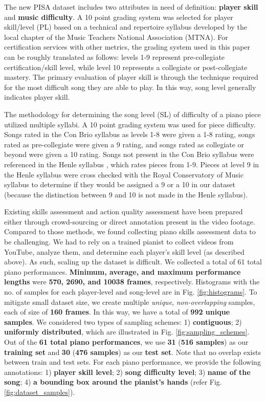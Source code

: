 \documentclass{article}
\begin{document}
The new PISA dataset includes two attributes in need of definition: \textbf{player skill} and \textbf{music difficulty}. A 10 point grading system was selected for player skill/level (PL) based on a technical and repertoire syllabus \cite{jaiden_1} developed by the local chapter of the Music Teachers National Association (MTNA). For certification services with other metrics, the grading system used in this paper can be roughly translated as follows: levels 1-9 represent pre-collegiate certification/skill level, while level 10 represents a collegiate or post-collegiate mastery. The primary evaluation of player skill is through the technique required for the most difficult song they are able to play. In this way, song level generally indicates player skill.

The methodology for determining the song level (SL) of difficulty of a piano piece utilized multiple syllabi. A 10 point grading system was used for piece difficulty. Songs rated in the Con Brio syllabus \cite{jaiden_3} as levels 1-8 were given a 1-8 rating, songs rated as pre-collegiate were given a 9 rating, and songs rated as collegiate or beyond were given a 10 rating. Songs not present in the Con Brio syllabus were referenced in the Henle syllabus \cite{jaiden_4}, which rates pieces from 1-9. Pieces at level 9 in the Henle syllabus were cross checked with the Royal Conservatory of Music syllabus \cite{jaiden_2} to determine if they would be assigned a 9 or a 10 in our dataset (because the distinction between 9 and 10 is not made in the Henle syllabus). 

Existing skills assessment and action quality assessment have been prepared either through crowd-sourcing or direct annotation present in the video footage. Compared to those methods, we found collecting piano skills assessment data to be challenging. We had to rely on a trained pianist to collect videos from YouTube, analyze them, and determine each player’s skill level (as described above). As such, scaling up the dataset is difficult. We collected a total of 61 total piano performances. \textbf{Minimum, average, and maximum performance lengths} were \textbf{570, 2690, and 10038 frames}, respectively. Histograms with the no. of samples for each player-level and song-level are in Fig. \ref{fig:histograms}. To mitigate small dataset size, we create multiple \textit{unique}, \textit{non-overlapping} samples, each of size of \textbf{160 frames}. In this  way, we have a total of \textbf{992 unique samples}. We considered two types of sampling schemes: 1) \textbf{contiguous}; 2) \textbf{uniformly distributed}, which are illustrated in Fig. \ref{fig:sampling_schemes}. Out of the \textbf{61 total piano performances}, we use \textbf{31} (\textbf{516 samples}) as our \textbf{training set} and \textbf{30} (\textbf{476 samples}) as our \textbf{test set}. Note that no overlap exists between train and test sets. For each piano performance, we provide the following annotations: 1) \textbf{player skill level}; 2) \textbf{song difficulty level}; 3) \textbf{name of the song}; 4) \textbf{a bounding box around the pianist’s hands} (refer Fig. \ref{fig:dataset_samples}).
\end{document}
